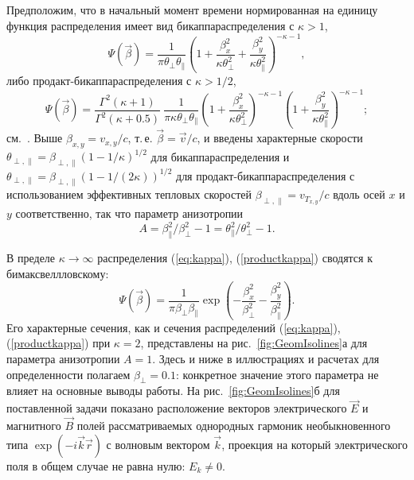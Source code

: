 Предположим, что в начальный момент времени нормированная на единицу функция распределения имеет вид бикаппа{\PunctumKappa}распределения с $\kappa >  1$, 
\begin{equation}
\label{eq:kappa}
    \Psi(\vec{\beta})=\dfrac{1}{\pi\theta_{\perp}\theta_{\|} } \left(1+\dfrac{\beta_x^2}{\kappa\theta_{\perp}^2}+\dfrac{\beta_y^2}{\kappa\theta_{\|}^2}\right)^{-\kappa-1} ,
\end{equation}
либо продакт-бикаппа{\PunctumKappa}распределения с $\kappa > 1/2$, 
\begin{equation}
\label{productkappa}
\Psi(\vec{\beta}) = \dfrac{\Gamma^2(\kappa+1)}{\Gamma^2(\kappa+0.5)} \: \dfrac{1}{\pi\kappa\theta_{\perp}\theta_{\|}}\left(1+\dfrac{\beta_x^2}{\kappa\theta_{\perp}^2}\right)^{-\kappa-1} \!\left(1+\dfrac{\beta_y^2}{\kappa\theta_{\|}^2}\right)^{-\kappa-1};
\end{equation}
см.~\cite{Lazar2010, Livadiotis2017, Livadiotis2021,Pierrard2010}. Выше $\beta_{x,y}={v_{x,y}}/{c}$, т.\,е. $\vec{\beta}=\vec{v}/{c}$, и введены характерные скорости $\theta_{\perp,\|}=\beta_{\perp,\|}\left(1-1/\kappa\right)^{1/2}$ для бикаппа{\PunctumKappa}распределения и $\theta_{\perp,\|}=\beta_{\perp,\|}\left(1-1/(2\kappa)\right)^{1/2}$ для продакт-бикаппа{\PunctumKappa}распределения с использованием эффективных тепловых скоростей $\beta_{\perp,\|}={v_{T_{x,y}}}/{c}$ вдоль осей $x$ и $y$ соответственно, так что параметр анизотропии
\begin{equation}
A={\beta^2_{\|}}/{\beta^2_{\perp}}-1={\theta^2_{\|}}/{\theta^2_{\perp}}-1.
\end{equation}

В пределе $\kappa \rightarrow \infty$ распределения (\ref{eq:kappa}), (\ref{productkappa}) сводятся к бимаксвеллловскому:
\begin{equation}
\label{bimax}
\Psi(\vec{\beta})=\dfrac{1}{\pi\beta_{\perp} \beta_{\|} } \exp\left(-\dfrac{\beta_x^2}{\beta_{\perp}^2}-\dfrac{\beta_y^2}{\beta_{\|}^2}\right).
\end{equation}
Его характерные сечения, как и сечения распределений (\ref{eq:kappa}), (\ref{productkappa}) при $\kappa=2$, представлены на рис.~\ref{fig:GeomIsolines}а для параметра анизотропии $A=1$. Здесь и ниже в иллюстрациях и расчетах для определенности полагаем $\beta_{\perp}=0.1$: конкретное значение этого параметра не влияет на основные выводы работы. На рис.~\ref{fig:GeomIsolines}б для поставленной задачи показано расположение векторов электрического $\vec{E}$ и магнитного $\vec{B}$ полей рассматриваемых однородных гармоник необыкновенного типа $\exp(-i\vec{k}\vec{r})$ с волновым вектором $\vec{k}$, проекция на который электрического поля в общем случае не равна нулю: $E_k\neq0$.


